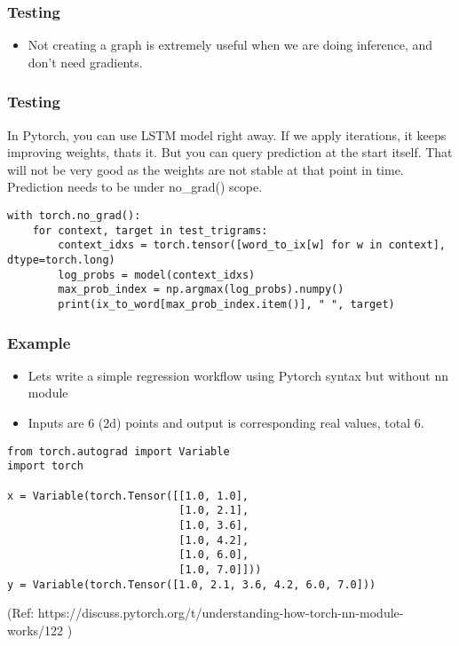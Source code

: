 \begin{frame}[fragile]
\frametitle{Testing}
\begin{itemize}
\item Not creating a graph is extremely useful when we are doing inference, and don't need gradients.
\end{itemize}
   
\end{frame} 

\begin{frame}[fragile]
\frametitle{Testing}
 In Pytorch, you can use LSTM model right away. If we apply iterations, it keeps improving weights, thats it. But you can query prediction at the start itself. That will not be very good as the weights are not stable at that point in time. Prediction needs to be under no\_grad() scope.
 
 \begin{lstlisting}
with torch.no_grad():
    for context, target in test_trigrams:
        context_idxs = torch.tensor([word_to_ix[w] for w in context], dtype=torch.long)
        log_probs = model(context_idxs)
        max_prob_index = np.argmax(log_probs).numpy()
        print(ix_to_word[max_prob_index.item()], " ", target)
\end{lstlisting}     
\end{frame} 

\begin{frame}[fragile]
\frametitle{Example}
 \begin{itemize}
\item Lets write a simple regression workflow using Pytorch syntax but without nn module
\item  
 Inputs are 6 (2d) points and output is corresponding real values, total 6.
 \end{itemize}

 \begin{lstlisting}
from torch.autograd import Variable
import torch

x = Variable(torch.Tensor([[1.0, 1.0], 
                           [1.0, 2.1], 
                           [1.0, 3.6], 
                           [1.0, 4.2], 
                           [1.0, 6.0], 
                           [1.0, 7.0]]))
y = Variable(torch.Tensor([1.0, 2.1, 3.6, 4.2, 6.0, 7.0]))
\end{lstlisting}   

{\tiny (Ref: https://discuss.pytorch.org/t/understanding-how-torch-nn-module-works/122 )} 
\end{frame} 

